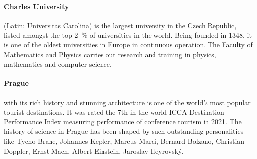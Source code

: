 \documentclass[12pt]{extarticle}
\begin{document}
\paragraph{Charles University} (Latin: Universitas Carolina) is the
largest university in the Czech Republic, listed amongst the top
\qty{2}{\percent} of universities in the world. Being founded in 1348,
it is one of the oldest universities in Europe in continuous
operation. The Faculty of Mathematics and Physics carries out research
and training in physics, mathematics and computer science.

\paragraph{Prague} with its rich history and stunning architecture is
one of the world's most popular tourist destinations. It was rated the
7th in the world ICCA Destination Performance Index measuring
performance of conference tourism in 2021. The history of science in
Prague has been shaped by such outstanding personalities like Tycho
Brahe, Johannes Kepler, Marcus Marci, Bernard Bolzano, Christian
Doppler, Ernst Mach, Albert Einstein, Jaroslav Heyrovský.
\end{document}
